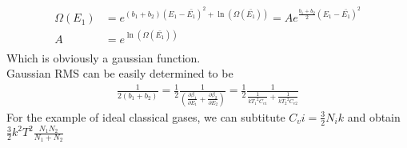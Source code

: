 \documentclass{article}
\begin{document}
\begin{align}
\Omega(E_1)&=e^{(b_1+b_2)(E_1-\bar{E_1})^2+\ln(\Omega(\bar{E_1}))}=Ae^{\frac{b_1+b_2}{2}(E_1-\bar{E_1})^2}\\
A&=e^{\ln(\Omega(\bar{E_1}))}\\
\end{align}
Which is obviously a gaussian function.\\
Gaussian RMS can be easily determined to be
\begin{align}
\frac{1}{2(b_1+b_2)}=\frac{1}{2}\frac{1}{(\frac{\partial \beta_1}{\partial E_1}+\frac{\partial \beta_2}{\partial E_2})}=\frac{1}{2}\frac{1}{\frac{1}{k{T_1}^2C_{v1}}+\frac{1}{k{T_2}^2C_{v2}}}
\end{align}
For the example of ideal classical gases, we can subtitute $C_vi=\frac{3}{2}N_ik$ and obtain $\frac{3}{2}k^2T^2\frac{N_1N_2}{N_1+N_2}$\\
\end{document}
